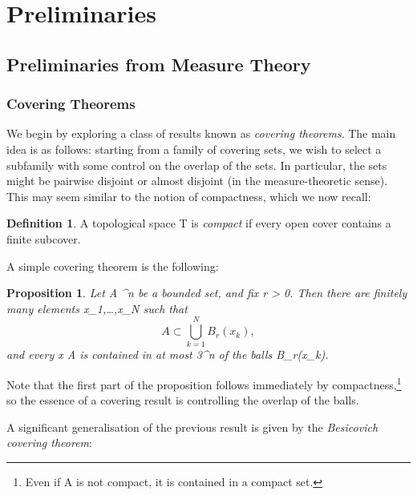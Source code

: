 \documentclass[a4paper, 11pt]{article}
\theoremstyle{plain}
\newtheorem{proposition}[theorem]{Proposition}
\theoremstyle{definition}
\newtheorem{definition}[theorem]{Definition}
\theoremstyle{remark}
\numberwithin{equation}{subsection}
\def\({}
\def\){}
\begin{document}
  
\section{Preliminaries}
\label{Preliminaries}

\subsection{Preliminaries from Measure Theory}

\subsubsection{Covering Theorems}

We begin by exploring a class of results known as \emph{covering theorems}. The main idea is as follows: starting from a family of covering sets, we wish to select a subfamily with some control on the overlap of the sets. In particular, the sets might be pairwise disjoint or almost disjoint (in the measure-theoretic sense). This may seem similar to the notion of compactness, which we now recall:

\begin{definition}
A topological space \(T\) is \emph{compact} if every open cover contains a finite subcover.
\end{definition}

A simple covering theorem is the following:

\begin{proposition}
Let \(A \subset {}^{n}\) be a bounded set, and fix \(r > 0\). Then there are finitely many elements \(x_{1},\ldots,x_{N}\) such that
\begin{equation}
A \subset \bigcup_{k=1}^{N}B_{r}(x_{k}),
\end{equation}
and every \(x \in A\) is contained in at most \(3^{n}\) of the balls \(B_{r}(x_{k})\).
\end{proposition}

Note that the first part of the proposition follows immediately by compactness,\footnote{Even if A is not compact, it is contained in a compact set.} so the essence of a covering result is controlling the overlap of the balls.

A significant generalisation of the previous result is given by the \emph{Besicovich covering theorem}:
\end{document}
